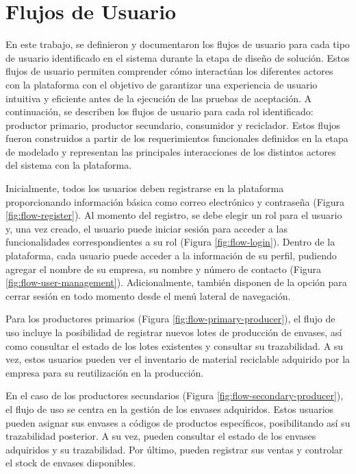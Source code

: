 \chapter[Flujos de usuario]{Flujos de Usuario}
\label{cp:user-flows}

\parindent0pt

En este trabajo, se definieron y documentaron los flujos de usuario para cada tipo de usuario identificado en el sistema durante la etapa de diseño de solución. Estos flujos de usuario permiten comprender cómo interactúan los diferentes actores con la plataforma con el objetivo de garantizar una experiencia de usuario intuitiva y eficiente antes de la ejecución de las pruebas de aceptación. A continuación, se describen los flujos de usuario para cada rol identificado: productor primario, productor secundario, consumidor y reciclador. Estos flujos fueron construidos a partir de los requerimientos funcionales definidos en la etapa de modelado y representan las principales interacciones de los distintos actores del sistema con la plataforma.

Inicialmente, todos los usuarios deben registrarse en la plataforma proporcionando información básica como correo electrónico y contraseña (Figura \ref{fig:flow-register}). Al momento del registro, se debe elegir un rol para el usuario y, una vez creado, el usuario puede iniciar sesión para acceder a las funcionalidades correspondientes a su rol (Figura \ref{fig:flow-login}). Dentro de la plataforma, cada usuario puede acceder a la información de su perfil, pudiendo agregar el nombre de su empresa, su nombre y número de contacto (Figura \ref{fig:flow-user-management}). Adicionalmente, también disponen de la opción para cerrar sesión en todo momento desde el menú lateral de navegación.

Para los productores primarios (Figura \ref{fig:flow-primary-producer}), el flujo de uso incluye la posibilidad de registrar nuevos lotes de producción de envases, así como consultar el estado de los lotes existentes y consultar su \gls{trazabilidad}. A su vez, estos usuarios pueden ver el inventario de material reciclable adquirido por la empresa para su reutilización en la producción.

En el caso de los productores secundarios (Figura \ref{fig:flow-secondary-producer}), el flujo de uso se centra en la gestión de los envases adquiridos. Estos usuarios pueden asignar sus envases a códigos de productos específicos, posibilitando así su trazabilidad posterior. A su vez, pueden consultar el estado de los envases adquiridos y su trazabilidad. Por último, pueden registrar sus ventas y controlar el stock de envases disponibles.

